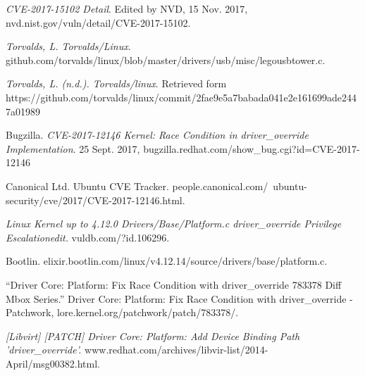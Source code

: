 \documentclass[12pt]{article}
\begin{document}
\newpage
\begin{thebibliography}{9}
	\textit{CVE-2017-15102 Detail}. Edited by NVD, 15 Nov. 2017, nvd.nist.gov/vuln/detail/CVE-2017-15102.
	
	\textit{Torvalds, L. Torvalds/Linux}. \\github.com/torvalds/linux/blob/master/drivers/usb/misc/legousbtower.c.
	
	\textit{Torvalds, L. (n.d.). Torvalds/linux}. Retrieved form \\
	https://github.com/torvalds/linux/commit/2fae9e5a7babada041e2e161699ade2447a01989

Bugzilla.\textit{ CVE-2017-12146 Kernel: Race Condition in driver\_override Implementation}. 25 Sept. 2017, bugzilla.redhat.com/show\_bug.cgi?id=CVE-2017-12146

Canonical Ltd. Ubuntu CVE Tracker. people.canonical.com/~ubuntu-security/cve/2017/CVE-2017-12146.html.

\textit{Linux Kernel up to 4.12.0 Drivers/Base/Platform.c driver\_override Privilege Escalationedit.} vuldb.com/?id.106296.

Bootlin. elixir.bootlin.com/linux/v4.12.14/source/drivers/base/platform.c.


“Driver Core: Platform: Fix Race Condition with driver\_override 783378 Diff Mbox Series.” Driver Core: Platform: Fix Race Condition with driver\_override - Patchwork, lore.kernel.org/patchwork/patch/783378/.

\textit{[Libvirt] [PATCH] Driver Core: Platform: Add Device Binding Path 'driver\_override'.} www.redhat.com/archives/libvir-list/2014-April/msg00382.html.
\end{thebibliography}
\end{document}
